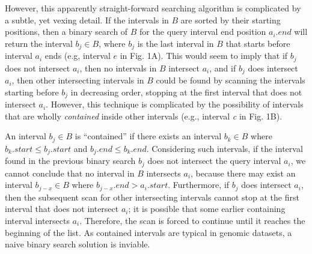\documentclass{bioinfo}
\begin{document}
However, this apparently straight-forward searching algorithm is complicated by
a subtle, yet vexing detail. If the intervals in $B$ are sorted by their
starting positions, then a binary search of $B$ for the query interval end
position $a_i.end$ will return the interval $b_j \in B$, where $b_j$ is the last
interval in $B$ that starts before interval $a_i$ ends (e.g, interval $e$ in
Fig. 1A).  This would seem to imply that if $b_j$ does not intersect $a_i$, then
no intervals in $B$ intersect $a_i$, and if $b_j$ does intersect $a_i$, then
other intersecting intervals in $B$ could be found by scanning the intervals
starting before $b_j$ in decreasing order, stopping at the first interval that
does not intersect $a_i$.  However, this technique is complicated by the
possibility of intervals that are wholly {\em contained} inside other intervals
(e.g., interval \emph{c} in Fig. 1B). 

An interval $b_j\in B$ is ``contained'' if there exists an interval $b_k \in B$
where $b_k.start \leq b_j.start$ and $b_j.end \leq b_k.end$.  Considering such
intervals, if the interval found in the previous binary search $b_j$ does not
intersect the query interval $a_i$, we cannot conclude that no interval in $B$
intersects $a_i$, because there may exist an interval $b_{j-x} \in B$ where
$b_{j-x}.end > a_i.start$.  Furthermore, if $b_j$ does intersect $a_i$, then the
subsequent scan for other intersecting intervals cannot stop at the first
interval that does not intersect $a_i$; it is possible that some earlier
containing interval intersects $a_i$. Therefore, the scan is forced to continue
until it reaches the beginning of the list. As contained intervals are
typical in genomic datasets, a naive binary search solution is inviable.
\end{document}
